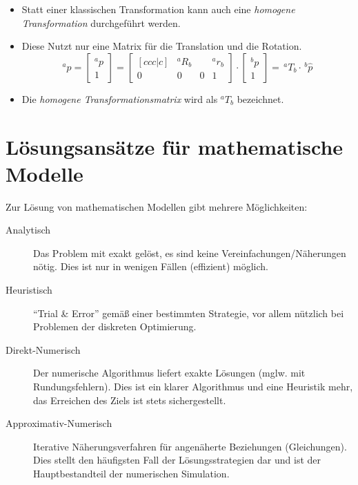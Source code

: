         \begin{itemize}
        	\item Statt einer klassischen Transformation kann auch eine \textit{homogene Transformation} durchgeführt werden.
        	\item Diese Nutzt nur eine Matrix für die Translation und die Rotation.
            	\begin{equation*}
		            ^a\hat{p} =
		            \begin{bmatrix}
			            ^ap \\ \hline
			            1
		            \end{bmatrix}
		            =
		            \begin{bmatrix}[ccc|c]
			            & ^aR_b & & ^ar_b \\ \hline
			            0 & 0 & 0 & 1
		            \end{bmatrix}
		            \cdot
		            \begin{bmatrix}
			            ^bp \\ \hline
			            1
		            \end{bmatrix}
		            = \,^aT_b \cdot \,^b\hat{p}
            	\end{equation*}
            \item Die \textit{homogene Transformationsmatrix} wird als \( ^aT_b \) bezeichnet.
        \end{itemize}

    \section{Lösungsansätze für mathematische Modelle} %
        Zur Lösung von mathematischen Modellen gibt mehrere Möglichkeiten:
        \begin{description}
        	\item[Analytisch] Das Problem mit exakt gelöst, es sind keine Vereinfachungen/Näherungen nötig. Dies ist nur in wenigen Fällen (effizient) möglich.
        	\item[Heuristisch] \enquote{Trial \& Error} gemäß einer bestimmten Strategie, vor allem nützlich bei Problemen der diskreten Optimierung.
        	\item[Direkt-Numerisch] Der numerische Algorithmus liefert exakte Lösungen (mglw. mit Rundungsfehlern). Dies ist ein klarer Algorithmus und eine Heuristik mehr, das Erreichen des Ziels ist stets sichergestellt.
        	\item[Approximativ-Numerisch] Iterative Näherungsverfahren für angenäherte Beziehungen (Gleichungen). Dies stellt den häufigsten Fall der Lösungsstrategien dar und ist der Hauptbestandteil der numerischen Simulation.
        \end{description}
        
